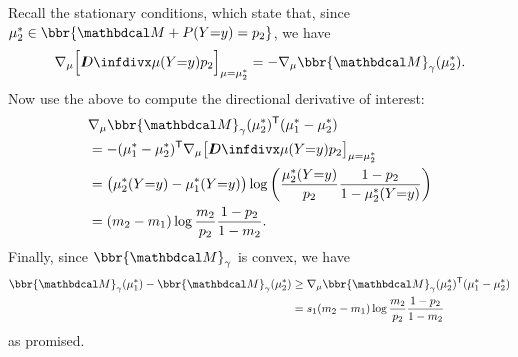 \begin{lproof}
    Recall the stationary conditions, which state that, 
    since $\mu_2^* \in \bbr{\dg M + \Pr(Y{=}y) = p_2}$, we have
    \[
        \nabla_\mu \Big[\kldiv{\mu(Y{=}y)}{p_2} \Big]_{\mu=\mu_2^*} = -
            \nabla_\mu \bbr{\dg M}_\gamma(\mu_2^*).
    \]
    Now use the above to compute the directional derivative of interest:
    \begin{align*}
        &\nabla_\mu \bbr{\dg M}_\gamma(\mu_2^*)^{\sf T} (\mu_1^* - \mu_2^*)
        \\
        &= -(\mu_1^* - \mu_2^*)^{\sf T} \nabla_\mu \big[ \kldiv{\mu(Y{=}y)}{p_2} \big]_{\mu=\mu_2^*} \\
        &= \big( \mu_2^*(Y{=}y) - \mu_1^*(Y{=}y) \big) \log \left( \frac{\mu_2^*(Y{=}y)}{p_2} \frac{1-p_2}{1-\mu_2^*(Y{=}y)} \right) \\
        &= (m_2-m_1) \log \frac{m_2}{p_2}\frac{1-p_2}{1-m_2}.
    \end{align*}
    Finally, since $\bbr{\dg M}_\gamma$ is convex, we have
    \begin{align*}
        \bbr{\dg M}_\gamma(\mu_1^*) - \bbr{\dg M}_\gamma(\mu_2^*)
            &\ge \nabla_\mu \bbr{\dg M}_\gamma(\mu_2^*)^{\sf T} (\mu_1^* - \mu_2^*)
                \\
            &= s_1
                (m_2 - m_1 )
                \log
                \frac{m_2}{p_2}
                \frac{1-p_2}{1-m_2}
    \end{align*}
    as promised.
\end{lproof}


